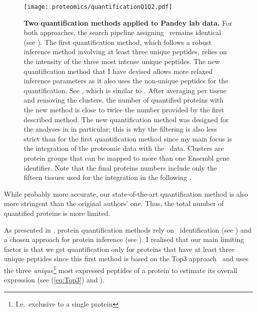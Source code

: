 \begin{figure}[!htbp]
    \texttt{[image: proteomics/quantificationQ1Q2.pdf]}\centering
    \caption[Two quantification methods for Pandey lab data]{\label{fig:newQuantProtMeth}\textbf{Two
    quantification methods applied to Pandey lab data.}
    For both approaches, the search pipeline assigning \psms\ remains identical
    (see ).
    The first quantification method,
    which follows a robust inference method
    involving at least three unique peptides,
    relies on the intensity of the three most intense unique peptides.
    The new quantification method that I have devised
    allows more relaxed inference parameters
    as it also uses the non-unique peptides for the quantification.
    See ,
    which is similar to .
    After averaging per tissue and removing the clusters,
    the number of quantified proteins with the new method
    is close to twice the number provided by the first described method.
    The new quantification method was designed
    for the analyses in  in particular;
    this is why the filtering is also less strict than for the first quantification method
    since my main focus is the integration of the proteomic data
    with the \Rnaseq\ data.
    Clusters are protein groups that can be mapped to
    more than one \gls{Ensembl} gene identifier.
    Note that the final proteins numbers include only the fifteen tissues
    used for the integration in the following .
    }
\end{figure}

While probably more accurate,
our state-of-the-art quantification method is also
more stringent than the original authors' one.
Thus, the total number of quantified proteins is more limited.\mybr\

As presented in ,
protein quantification methods rely on
\psms\ identification (see )
and a chosen approach for protein inference (see ).
I realised that our main limiting factor is that
we get quantification only for proteins
that have at least three unique peptides
since this first method is based on the Top3 approach~
and uses the three \emph{unique}\footnote{I.e.\ exclusive to a single protein}
most expressed peptides of a protein to estimate its overall expression
(see  (\vref{eq:Top3}) and ).\mybr\

